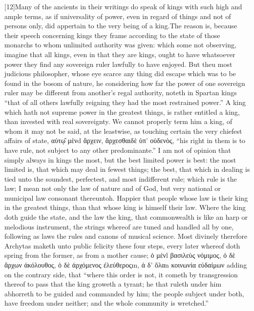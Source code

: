 [12]Many of the ancients in their writings do speak of kings with such high and ample terms, as if universality of power, even in regard of things and not of persons only, did appertain to the very being of a king.The reason is, because their speech concerning kings they frame according to the state of those monarchs to whom unlimited authority was given: which some not observing, imagine that all kings, even in that they are kings, ought to have whatsoever power they find any sovereign ruler lawfully to have enjoyed. But theu most judicious philosopher, whose eye scarce any thing did escape which was to be found in the bosom of nature, he considering how far the power of one sovereign ruler may be different from another’s regal authority, noteth in Spartan kings “that of all others lawfully reigning they had the  most restrained power.” A king which hath not supreme power in the greatest things, is rather entitled a king, than invested with real sovereignty. We cannot properly term him a king, of whom it may not be said, at the leastwise, as touching certain the very chiefest affairs of state, αὐτῳ̑ μὲνd ἄρχειν, ἄρχεσθαιδὲ ὑπ’ οὐδενὸς, “his right in them is to have rule, not subject to any other predominante.” I am not of opinion that simply always in kings the most, but the best limited power is best: the most limited is, that which may deal in fewest things; the best, that which in dealing is tied unto the soundest, perfectest, and most indifferent rule; which rule is the law; I mean not only the law of nature and of God, but very national or municipal law consonant thereuntoh. Happier that people whose law is their king in the greatest things, than that whose king is himself their law. Where the king doth guide the state, and the law the king, that commonwealth is like an harp or melodious instrument, the strings whereof are tuned and handled all by one, following as laws the rules and canons of musical science. Most divinely therefore Archytas maketh unto public felicity these four steps, every later whereof doth spring from the former, as from a mother cause; ὁ μὲνl βασιλεὺς νόμιμος, ὁ δὲ ἄρχων ἀκόλουθος, ὁ δὲ ἀρχόμενος ἐλεύθεροςm, ἁ δ’ ὅλαn κοινωνία εὐδαίμων adding on the contrary side, that “where this order is not, it cometh by transgression thereof to pass that the king groweth a tyrant; he that ruleth under him abhorreth  to be guided and commanded by him; the people subject under both, have freedom under neither; and the whole community is wretched.”

